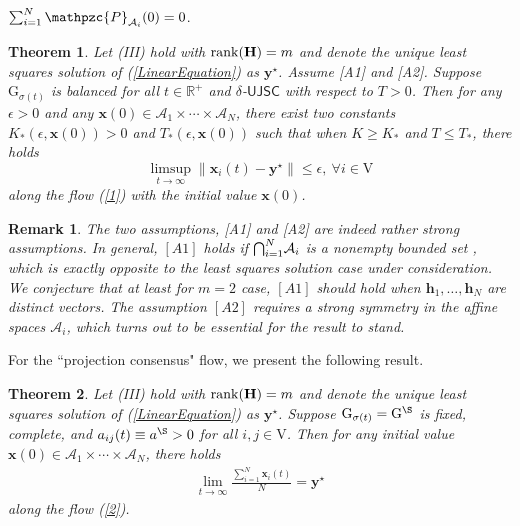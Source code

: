 \documentclass[a4paper, 11pt]{article}
\newcommand*\mcap{\mathbin{\mathpalette\mcapinn\relax}}
\newcommand*\mcapinn[2]{\vcenter{\hbox{$\mathsurround=0pt
  \ifx\displaystyle#1\textstyle\else#1\fi\bigcap$}}}
\newtheorem{theorem}{Theorem}
\newtheorem{remark}{Remark}
\begin{document}
\noindent {\bf [A2]} $\sum_{i=1}^N \mathpzc{P}_{\mathcal{A}_i}(0)=0$.



\begin{theorem}\label{thm6}
Let (III) hold with ${\rm rank}{(\mathbf{H})}=m$ and  denote the unique least squares solution of (\ref{LinearEquation}) as $\mathbf{y}^\star$. Assume [A1] and [A2].  Suppose $\mathrm{G}_{\sigma(t)}$ is balanced for all $t\in \mathbb{R}^+$ and   $\delta$-$\mathsf{UJSC}$ with respect to $T>0$. Then   for any $\epsilon>0$ and  any $\mathbf{x}(0)\in \mathcal{A}_1\times\cdots \times \mathcal{A}_N$, there exist two constants $K_\ast(\epsilon,\mathbf{x}(0))>0$ and $T_\ast(\epsilon,\mathbf{x}(0))$ such that
when $K\geq K_\ast$ and $T\leq T_\ast$, there holds $$
\limsup_{t\to \infty} \big\|\mathbf{x}_i(t)-\mathbf{y}^\star\big\|\leq \epsilon, \ \forall i\in\mathrm{V}
$$
along  the flow (\ref{1}) with the initial value $\mathbf{x}(0)$.
\end{theorem}



\begin{remark}
The two assumptions, [A1] and [A2] are indeed rather strong assumptions. In general, $[A1]$ holds if $\mcap_{i=1}^N \mathcal{A}_i$ is a nonempty bounded set \cite{B-B-SIAM}, which is exactly opposite to the least squares solution case under consideration. We conjecture that at least for $m=2$ case, $[A1]$ should hold  when $\mathbf{h}_1,\dots,\mathbf{h}_N$ are distinct vectors.  The assumption $[A2]$ requires a strong  symmetry in the affine spaces $\mathcal{A}_i$, which turns out to be essential for the result to stand.
\end{remark}



For the ``projection consensus" flow, we present the following result.

\begin{theorem}\label{thm7}
Let (III) hold with ${\rm rank}{(\mathbf{H})}=m$ and  denote the unique least squares solution of (\ref{LinearEquation}) as $\mathbf{y}^\star$. Suppose $\mathrm{G}_{\sigma(t)}=\mathrm{G}^\S$ is fixed, complete, and $a_{ij}(t) \equiv a^\S >0$ for all $i,j\in\mathrm{V}$.
Then    for any  initial value  $\mathbf{x}(0)\in \mathcal{A}_1\times\cdots \times \mathcal{A}_N$, there holds
\begin{align}
\lim_{t \to \infty} \frac{\sum_{i=1}^N \mathbf{x}_i(t)}{N} =\mathbf{y}^\star
\end{align}
along  the flow (\ref{2}).
\end{theorem}
\end{document}
